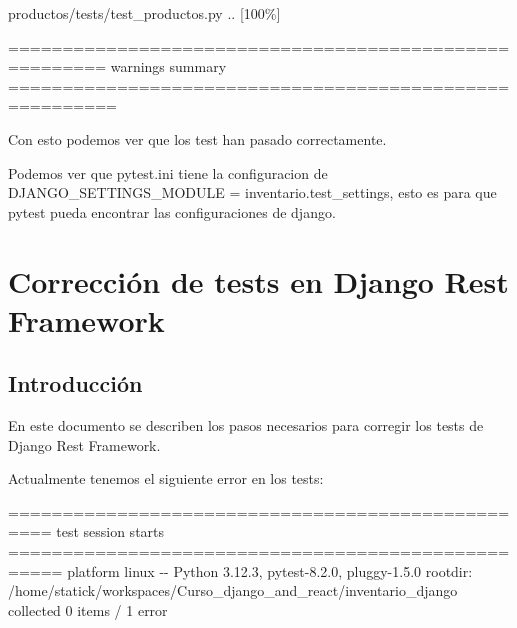 \documentclass[
  a4paper,
  DIV=11,
  numbers=noendperiod,
  onepage,
  openany]{scrreprt}
\newenvironment{Shaded}{\begin{snugshade}}{\end{snugshade}}
\newcommand{\ExtensionTok}[1]{\textcolor[rgb]{0.00,0.23,0.31}{#1}}
\newcommand{\NormalTok}[1]{\textcolor[rgb]{0.00,0.23,0.31}{#1}}
\newcommand{\PreprocessorTok}[1]{\textcolor[rgb]{0.68,0.00,0.00}{#1}}
\newcommand{\SpecialStringTok}[1]{\textcolor[rgb]{0.13,0.47,0.30}{#1}}
\begin{document}
\begin{tcolorbox}
\begin{Shaded}
\begin{Highlighting}[]
\ExtensionTok{productos/tests/test\_productos.py}\NormalTok{ ..                                                                                      }\PreprocessorTok{[}\SpecialStringTok{100\%}\PreprocessorTok{]}

\ExtensionTok{=======================================================}\NormalTok{ warnings summary ========================================================}
\end{Highlighting}
\end{Shaded}

Con esto podemos ver que los test han pasado correctamente.

Podemos ver que pytest.ini tiene la configuracion de
DJANGO\_SETTINGS\_MODULE = inventario.test\_settings, esto es para que
pytest pueda encontrar las configuraciones de django.

\chapter{Corrección de tests en Django Rest
Framework}\label{correcciuxf3n-de-tests-en-django-rest-framework}

\section{Introducción}\label{introducciuxf3n-1}

En este documento se describen los pasos necesarios para corregir los
tests de Django Rest Framework.

Actualmente tenemos el siguiente error en los tests:

\begin{Shaded}
\begin{Highlighting}[]
\NormalTok{================================================== test session starts ===================================================}
\NormalTok{platform linux {-}{-} Python 3.12.3, pytest{-}8.2.0, pluggy{-}1.5.0}
\NormalTok{rootdir: /home/statick/workspaces/Curso\_django\_and\_react/inventario\_django}
\NormalTok{collected 0 items / 1 error                                                                                              }


\end{Highlighting}
\end{Shaded}
\end{tcolorbox}
\end{document}
